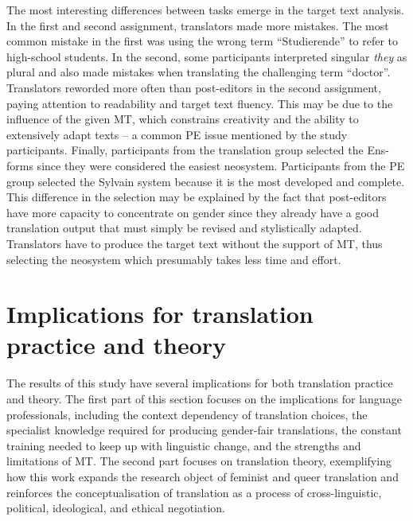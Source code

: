 The most interesting differences between tasks emerge in the target text analysis. In the first and second assignment, translators made more mistakes. The most common mistake in the first was using the wrong term ``Studierende'' to refer to high-school students. In the second, some participants interpreted singular \textit{they} as plural and also made mistakes when translating the challenging term ``doctor''. Translators reworded more often than post-editors in the second assignment, paying attention to readability and target text fluency. This may be due to the influence of the given MT, which constrains creativity and the ability to extensively adapt texts -- a common PE issue mentioned by the study participants. Finally, participants from the translation group selected the Ens-forms since they were considered the easiest neosystem. Participants from the PE group selected the Sylvain system because it is the most developed and complete. This difference in the selection may be explained by the fact that post-editors have more capacity to concentrate on gender since they already have a good translation output that must simply be revised and stylistically adapted. Translators have to produce the target text without the support of MT, thus selecting the neosystem which presumably takes less time and effort.

\section{Implications for translation practice and theory}
The results of this study have several implications for both translation practice and theory. The first part of this section focuses on the implications for language professionals, including the context dependency of translation choices, the specialist knowledge required for producing gender-fair translations, the constant training needed to keep up with linguistic change, and the strengths and limitations of MT. The second part focuses on translation theory, exemplifying how this work expands the research object of feminist and queer translation and reinforces the conceptualisation of translation as a process of cross-linguistic, political, ideological, and ethical negotiation. 

